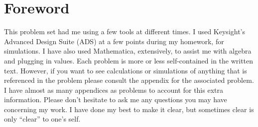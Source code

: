 \section*{Foreword}

This problem set had me using a few tools at different times. I used Keysight's
Advanced Design Suite (ADS) at a few points during my homework, for simulations.
I have also used Mathematica, extensively, to assist me with algebra and
plugging in values. Each problem is more or less self-contained in the written
text. However, if you want to see calculations or simulations of anything that
is referenced in the problem please consult the appendix for the associated
problem. I have almost as many appendices as problems to account for this extra
information. Please don't hesitate to ask me any questions you may have
concerning my work. I have done my best to make it clear, but sometimes clear is
only ``clear'' to one's self.

